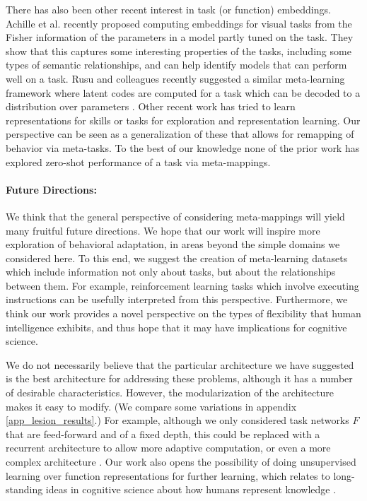 \documentclass{article}
\begin{document}
There has also been other recent interest in task (or function) embeddings. Achille et al. \citep{Achille2019} recently proposed computing embeddings for visual tasks from the Fisher information of the parameters in a model partly tuned on the task. They show that this captures some interesting properties of the tasks, including some types of semantic relationships, and can help identify models that can perform well on a task. Rusu and colleagues recently suggested a similar meta-learning framework where latent codes are computed for a task which can be decoded to a distribution over parameters \citep{Rusu2019}. Other recent work has tried to learn representations for skills \citep[e.g.][]{Eysenbach2019} or tasks \citep[e.g.]{Hsu2019} for exploration and representation learning. Our perspective can be seen as a generalization of these that allows for remapping of behavior via meta-tasks. To the best of our knowledge none of the prior work has explored zero-shot performance of a task via meta-mappings. \par
\paragraph{Future Directions:} We think that the general perspective of considering meta-mappings will yield many fruitful future directions. We hope that our work will inspire more exploration of behavioral adaptation, in areas beyond the simple domains we considered here. To this end, we suggest the creation of meta-learning datasets which include information not only about tasks, but about the relationships between them. For example, reinforcement learning tasks which involve executing instructions \citep[e.g.][]{Hermann2017, Co-Reyes2019} can be usefully interpreted from this perspective. Furthermore, we think our work provides a novel perspective on the types of flexibility that human intelligence exhibits, and thus hope that it may have implications for cognitive science. \par 
We do not necessarily believe that the particular architecture we have suggested is the best architecture for addressing these problems, although it has a number of desirable characteristics. However, the modularization of the architecture makes it easy to modify. (We compare some variations in appendix \ref{app_lesion_results}.) For example, although we only considered task networks $F$ that are feed-forward and of a fixed depth, this could be replaced with a recurrent architecture to allow more adaptive computation, or even a more complex architecture \citep[e.g.][]{Reed2015, Graves2016}. Our work also opens the possibility of doing unsupervised learning over function representations for further learning, which relates to long-standing ideas in cognitive science about how humans represent knowledge \citep{Clark1993}. \par 
\end{document}
